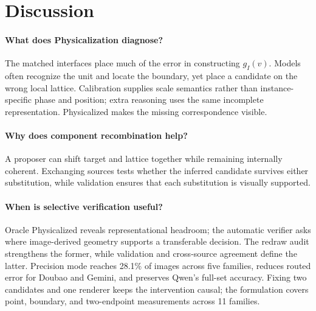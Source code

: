 \section{Discussion}
\label{sec:discussion}

\paragraph{What does Physicalization diagnose?}
The matched interfaces place much of the error in constructing $g_I(v)$. Models often recognize the unit and locate the boundary, yet place a candidate on the wrong local lattice. Calibration supplies scale semantics rather than instance-specific phase and position; extra reasoning uses the same incomplete representation. Physicalized makes the missing correspondence visible.

\paragraph{Why does component recombination help?}
A proposer can shift target and lattice together while remaining internally coherent. Exchanging sources tests whether the inferred candidate survives either substitution, while validation ensures that each substitution is visually supported.

\paragraph{When is selective verification useful?}
Oracle Physicalized reveals representational headroom; the automatic verifier asks where image-derived geometry supports a transferable decision. The redraw audit strengthens the former, while validation and cross-source agreement define the latter. Precision mode reaches 28.1\% of images across five families, reduces routed error for Doubao and Gemini, and preserves Qwen's full-set accuracy. Fixing two candidates and one renderer keeps the intervention causal; the formulation covers point, boundary, and two-endpoint measurements across 11 families.
